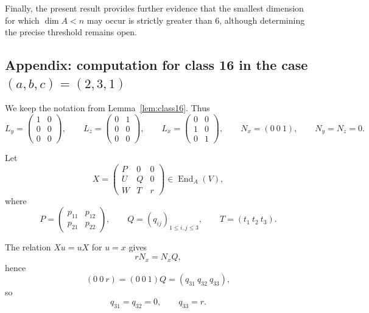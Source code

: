 \documentclass[11pt]{article}
\DeclareMathOperator{\End}{End}
\theoremstyle{plain}
\theoremstyle{remark}
\begin{document}
Finally, the present result provides further evidence that the smallest dimension for which $\dim A < n$ may occur is strictly greater than $6$, although determining the precise threshold remains open.





























\subsection*{Appendix: computation for class 16 in the case $(a,b,c)=(2,3,1)$}
	
	We keep the notation from Lemma~\ref{lem:class16}. Thus
	\[
	L_y=
	\begin{pmatrix}
		1&0\\
		0&0\\
		0&0
	\end{pmatrix},
	\qquad
	L_z=
	\begin{pmatrix}
		0&1\\
		0&0\\
		0&0
	\end{pmatrix},
	\qquad
	L_x=
	\begin{pmatrix}
		0&0\\
		1&0\\
		0&1
	\end{pmatrix},
	\qquad
	N_x=(0\ 0\ 1),
	\qquad
	N_y=N_z=0.
	\]
	
	Let
	\[
	X=
	\begin{pmatrix}
		P&0&0\\
		U&Q&0\\
		W&T&r
	\end{pmatrix}\in \End_A(V),
	\]
	where
	\[
	P=\begin{pmatrix}p_{11}&p_{12}\\ p_{21}&p_{22}\end{pmatrix},\qquad
	Q=(q_{ij})_{1\le i,j\le 3},\qquad
	T=(t_1\ t_2\ t_3).
	\]
	
	The relation \(Xu=uX\) for \(u=x\) gives
	\[
	rN_x=N_xQ,
	\]
	hence
	\[
	(0\ 0\ r)=(0\ 0\ 1)Q=(q_{31}\ q_{32}\ q_{33}),
	\]
	so
	\[
	q_{31}=q_{32}=0,\qquad q_{33}=r.
	\]
	
\end{document}
